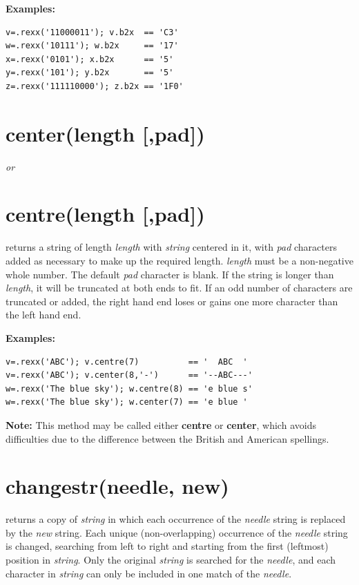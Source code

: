 \textbf{Examples:}
\begin{lstlisting}
v=.rexx('11000011'); v.b2x  == 'C3'
w=.rexx('10111'); w.b2x     == '17'
x=.rexx('0101'); x.b2x      == '5'
y=.rexx('101'); y.b2x       == '5'
z=.rexx('111110000'); z.b2x == '1F0'
\end{lstlisting}
  
\section{center(length [,pad{]})}\label{refcenter}

\emph{or}
\section{centre(length [,pad{]})}\label{refcentre}

returns a string of length \emph{length} with \emph{string}
centered in it, with \emph{pad} characters added as necessary to
make up the required length.
\emph{length} must be a non-negative whole number.
The default \emph{pad} character is blank.
If the string is longer than \emph{length}, it will be truncated at
both ends to fit.
If an odd number of characters are truncated or added, the right hand
end loses or gains one more character than the left hand end.
 
\textbf{Examples:}
\begin{lstlisting}
v=.rexx('ABC'); v.centre(7)          == '  ABC  '
v=.rexx('ABC'); v.center(8,'-')      == '--ABC---'
w=.rexx('The blue sky'); w.centre(8) == 'e blue s'
w=.rexx('The blue sky'); w.center(7) == 'e blue '
\end{lstlisting}
\textbf{Note: }This method may be called either \textbf{centre} or \textbf{center},
which avoids difficulties due to the difference between the British and
American spellings.
\section{changestr(needle, new)}\label{refchastr}

returns a copy of \emph{string} in which each occurrence of the
\emph{needle} string is replaced by the \emph{new} string.
Each unique (non-overlapping) occurrence of the \emph{needle} string
is changed, searching from left to right and starting from the first
(leftmost) position in \emph{string}.
Only the original \emph{string} is searched for the
\emph{needle}, and each character in \emph{string} can only be
included in one match of the \emph{needle}.
 
